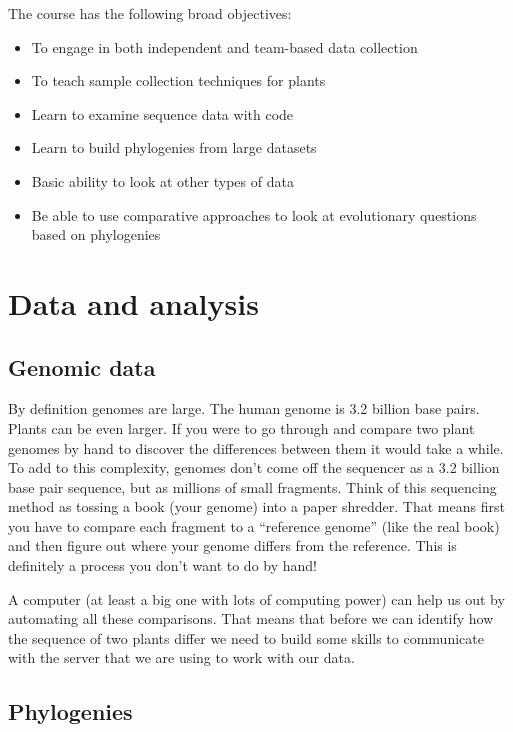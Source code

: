 \documentclass[
]{book}
\providecommand{\tightlist}{%
  \setlength{\itemsep}{0pt}\setlength{\parskip}{0pt}}
\begin{document}
The course has the following broad objectives:

\begin{itemize}
\tightlist
\item
  To engage in both independent and team-based data collection
\item
  To teach sample collection techniques for plants
\item
  Learn to examine sequence data with code
\item
  Learn to build phylogenies from large datasets
\item
  Basic ability to look at other types of data
\item
  Be able to use comparative approaches to look at evolutionary questions based on phylogenies
\end{itemize}

\hypertarget{data-and-analysis}{%
\chapter{Data and analysis}\label{data-and-analysis}}

\hypertarget{genomic-data}{%
\section{Genomic data}\label{genomic-data}}

By definition genomes are large.
The human genome is 3.2 billion base pairs.
Plants can be even larger.
If you were to go through and compare two plant genomes by hand to discover the differences between them it would take a while.
To add to this complexity, genomes don't come off the sequencer as a 3.2 billion base pair sequence,
but as millions of small fragments.
Think of this sequencing method as tossing a book (your genome) into a paper shredder.
That means first you have to compare each fragment to a ``reference genome'' (like the real book)
and then figure out where your genome differs from the reference.
This is definitely a process you don't want to do by hand!

A computer (at least a big one with lots of computing power) can help us out by automating all these comparisons.
That means that before we can identify how the sequence of two plants differ
we need to build some skills to communicate with the server that we are using to work with our data.

\hypertarget{phylogenies}{%
\section{Phylogenies}\label{phylogenies}}
\end{document}
